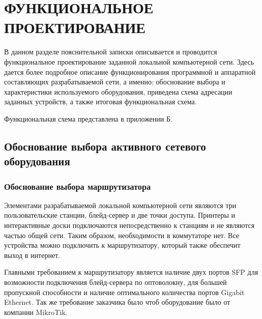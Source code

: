 \section{ФУНКЦИОНАЛЬНОЕ ПРОЕКТИРОВАНИЕ}
\label{sec:func}

В данном разделе пояснительной записки описывается и проводится функциональное проектирование заданной локальной компьютерной сети. Здесь дается более подробное описание функционирования программной и аппаратной составляющих разрабатываемой сети, а именно: обоснование выбора и характеристики используемого оборудования, приведена схема адресации заданных устройств, а также итоговая функциональная схема. 

Функциональная схема представлена в приложении Б.

\subsection{Обоснование выбора активного сетевого оборудования}


\subsubsection{Обоснование выбора маршрутизатора}

Элементами разрабатываемой локальной компьютерной сети являются три пользовательские станции, блейд-сервер и две точки доступа. Принтеры и интерактивные доски подключаются непосредственно к станциям и не являются частью общей сети. Таким образом, необходимости в коммутаторе нет. Все устройства можно подключить к маршрутизатору, который также обеспечит выход в интернет.

Главными требованием к маршрутизатору является наличие двух портов SFP для возможности подключения блейд-сервера по оптоволокну, для большей пропускной способности и наличие оптимального количества портов Gigabit Ethernet. Так же требование заказчика было чтоб оборудование было от компании MikroTik.

